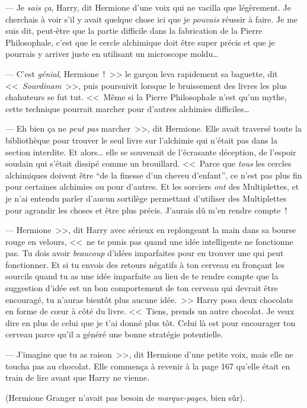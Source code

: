 --- Je \emph{sais ça}, Harry, dit Hermione d'une voix qui ne vacilla que légèrement. Je cherchais à voir s'il y avait quelque chose ici que je \emph{pouvais} réussir à faire. Je me suis dit, peut-être que la partie difficile dans la fabrication de la Pierre Philosophale, c'est que le cercle alchimique doit être super précis et que je pourrais y arriver juste en utilisant un microscope moldu…

--- C'est \emph{génial}, Hermione~!~>> le garçon leva rapidement sa baguette, dit <<~\emph{Sourdinam}~>>, puis poursuivit lorsque le bruissement des livres les plus chahuteurs se fut tut. <<~Même si la Pierre Philosophale n'est qu'un mythe, cette technique pourrait marcher pour d'autres alchimies difficiles…

--- Eh bien ça ne \emph{peut pas} marcher~>>, dit Hermione. Elle avait traversé toute la bibliothèque pour trouver le seul livre sur l'alchimie qui n'était pas dans la section interdite. Et alors… elle se souvenait de l'écrasante déception, de l'espoir soudain qui s'était dissipé comme un brouillard. <<~Parce que \emph{tous} les cercles alchimiques doivent être “de la finesse d'un cheveu d'enfant”, ce n'est pas plus fin pour certaines alchimies ou pour d'autres. Et les sorciers \emph{ont} des Multiplettes, et je n'ai entendu parler d'aucun sortilège permettant d'utiliser des Multiplettes pour agrandir les choses et être plus précis. J'aurais dû m'en rendre compte~!

--- Hermione~>>, dit Harry avec sérieux en replongeant la main dans sa bourse rouge en velours, <<~ne te punis pas quand une idée intelligente ne fonctionne pas. Tu dois avoir \emph{beaucoup} d'idées imparfaites pour en trouver une qui peut fonctionner. Et si tu envois des retours négatifs à ton cerveau en fronçant les sourcils quand tu as une idée imparfaite au lieu de te rendre compte que la suggestion d'idée est un bon comportement de ton cerveau qui devrait être encouragé, tu n'auras bientôt plus aucune idée.~>> Harry posa deux chocolats en forme de cœur à côté du livre. <<~Tiens, prends un autre chocolat. Je veux dire en plus de celui que je t'ai donné plus tôt. Celui là est pour encourager ton cerveau parce qu'il a généré une bonne stratégie potentielle.

--- J'imagine que tu as raison~>>, dit Hermione d'une petite voix, mais elle ne toucha pas au chocolat. Elle commença à revenir à la page 167 qu'elle était en train de lire avant que Harry ne vienne.

(Hermione Granger n'avait pas besoin de \emph{marque-pages}, bien sûr).

